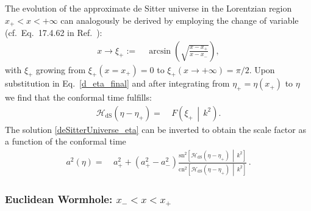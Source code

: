 \documentclass[aps,nofootinbib,prd,superscriptaddress,eqsecnum,showpacs,showkeys,preprintnumbers,altaffilletter]{revtex4}
\newcommand{\cn}{\mathrm{cn}}
\newcommand{\sn}{\mathrm{sn}}
\newcommand{\cHdS}{{\mathcal{H}}_{\mathrm{dS}}}
\begin{document}
The evolution of the approximate de Sitter universe in the Lorentzian region $x_+ < x < +\infty$ can analogously be derived by employing the change of variable  (cf.~Eq.~17.4.62 in Ref.~\cite{abra}):
\begin{align}
	x \rightarrow\xi_+ 
	:=&~ \arcsin\left(\sqrt{\frac{x-x_+}{x-x_-}}\right),
\end{align}
with $\xi_+$ growing from $\xi_+(x=x_+)=0$ to  $\xi_+(x\rightarrow+\infty)=\pi/2$.
Upon substitution in Eq.~\eqref{d_eta_final} and after integrating from $\eta_+=\eta(x_+)$ to $\eta$ we find that the conformal time fulfills:
\begin{align}
	\label{deSitterUniverse_eta}
	\cHdS\left(\eta - \eta_+\right)
	 =&~
	 F\left(\xi_+ \,\middle|\, k^ 2\right).
\end{align}
The solution \eqref{deSitterUniverse_eta} can be inverted to obtain the scale factor as a function of the conformal time
\begin{align}
	a^2(\eta) 
	=&~ a_+^2 + (a_+^2-a_-^2)
	\frac{\sn^2\!\left[{\cHdS} \left(\eta - \eta_+\right)\,\middle|\, k^2\right]}
	{\cn^2\!\left[{\cHdS} \left(\eta - \eta_+\right)\,\middle|\, k^ 2\right]}
	\,.
\end{align}

%
%

\subsubsection{Euclidean Wormhole: $x_- < x < x_+$}
\end{document}
